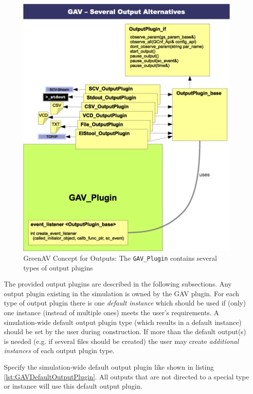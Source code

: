 \begin{figure}[htbp]
	\centerline{
		\includegraphics[width=12cm]{./images/GAVconcept(Outputs)}}
	\caption{GreenAV Concept for Outputs: The \lstinline|GAV_Plugin| contains several types of output plugins}
	\label{fig:GAVConceptOutputs}
\end{figure}


The provided output plugins are described in the following subsections. Any output plugin existing in the simulation is owned by the GAV plugin. For each type of output plugin there is one {\em default instance} which should be used if (only) one instance (instead of multiple ones) meets the user's requirements. A simulation-wide default output plugin type (which results in a default instance) should be set by the user during construction. If more than the default output(s) is needed (e.g. if several files should be created) the user may create {\em additional instances} of each output plugin type.

Specify the simulation-wide default output plugin like shown in listing \ref{lst:GAVDefaultOutputPlugin}. All outputs that are not directed to a special type or instance will use this default output plugin.

